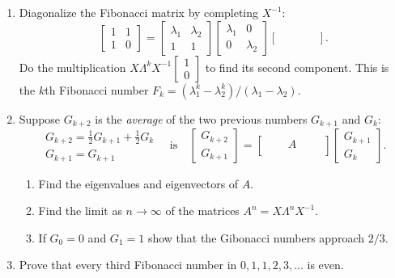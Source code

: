 \documentclass[14pt, a4paper]{article}
\begin{document}
\begin{enumerate}[resume]
    \item Diagonalize the Fibonacci matrix by completing $X^{-1}$:
          \[
              \begin{bmatrix} 1 & 1 \\ 1 & 0 \end{bmatrix} = \begin{bmatrix} \lambda_1 & \lambda_2 \\ 1 & 1 \end{bmatrix} \begin{bmatrix} \lambda_1 & 0 \\ 0 & \lambda_2 \end{bmatrix} \begin{bmatrix} \quad & \quad \\ \quad & \quad \end{bmatrix} .
          \]
          Do the multiplication $X \Lambda^k X^{-1} \begin{bmatrix} 1 \\ 0 \end{bmatrix}$ to find its second component. This is the $k$th Fibonacci number $F_k = (\lambda_1^k - \lambda_2^k)/(\lambda_1 - \lambda_2)$.

    \item Suppose $G_{k+2}$ is the \textit{average} of the two previous numbers $G_{k+1}$ and $G_k$:
          \[
              \begin{matrix} G_{k+2} = \frac{1}{2} G_{k+1} + \frac{1}{2} G_k \\ G_{k+1} = G_{k+1} \end{matrix} \quad \text{is} \quad \begin{bmatrix} G_{k+2} \\ G_{k+1} \end{bmatrix} = \begin{bmatrix} \quad & A & \quad \\ \quad & \quad & \quad \end{bmatrix} \begin{bmatrix} G_{k+1} \\ G_k \end{bmatrix} .
          \]
          \begin{enumerate}
              \item Find the eigenvalues and eigenvectors of $A$.
              \item Find the limit as $n \to \infty$ of the matrices $A^n = X \Lambda^n X^{-1}$.
              \item If $G_0 = 0$ and $G_1 = 1$ show that the Gibonacci numbers approach $2/3$.
          \end{enumerate}

    \item Prove that every third Fibonacci number in $0, 1, 1, 2, 3, \dots$ is even.
\end{enumerate}
\end{document}
